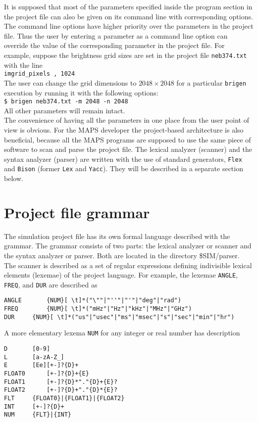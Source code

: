 \documentclass[letterpaper, oneside, 11pt]{article}
\begin{document}
It is supposed that most of the parameters specified inside the program section in the project file can also be given on its command line with corresponding options. The command line options have higher priority over the parameters in the project file. Thus the user by entering a parameter as a command line option can override the value of the corresponding parameter in the project file. For example, suppose the brightness grid sizes are set in the project file {\tt neb374.txt} with the line \\

{\tt imgrid\_pixels , 1024} \\

The user can change the grid dimensions to $2048 \times 2048$ for a particular {\tt brigen} execution by running it with the following options: \\
 
{\tt \$ brigen neb374.txt -m 2048 -n 2048}\\

All other parameters will remain intact. \\

The convenience of having all the parameters in one place from the user point of view is obvious. For the MAPS developer the project-based architecture is also beneficial, because all the MAPS programs are supposed to use the same piece of software to scan and parse the project file. The lexical analyzer (scanner) and the syntax analyzer (parser) are written with the use of standard generators, {\tt Flex} and {\tt Bison} (former {\tt Lex} and {\tt Yacc}). They will be described in a separate section below.


\section{Project file grammar}

The simulation project file has its own formal language described with the grammar. The grammar consists of two parts: the lexical analyzer or scanner and the syntax analyzer or parser. Both are located in the directory \$SIM/parser.\\

The scanner is described as a set of regular expressions defining indivisible lexical elements (lexemae) of the project language. For example, the lexemae {\tt ANGLE}, {\tt FREQ}, and {\tt DUR} are described as 
\begin{verbatim}
ANGLE		{NUM}[ \t]*("\""|"''"|"'"|"deg"|"rad")
FREQ		{NUM}[ \t]*("mHz"|"Hz"|"kHz"|"MHz"|"GHz")
DUR		{NUM}[ \t]*("us"|"usec"|"ms"|"msec"|"s"|"sec"|"min"|"hr")
\end{verbatim}
A more elementary lexema {\tt NUM} for any integer or real number has description
\begin{verbatim}
D		[0-9]
L		[a-zA-Z_]
E		[Ee][+-]?{D}+
FLOAT0		[+-]?{D}+{E}	
FLOAT1		[+-]?{D}*"."{D}+{E}?
FLOAT2		[+-]?{D}+"."{D}*{E}?
FLT		{FLOAT0}|{FLOAT1}|{FLOAT2}
INT		[+-]?{D}+
NUM		{FLT}|{INT}
\end{verbatim}
\end{document}
